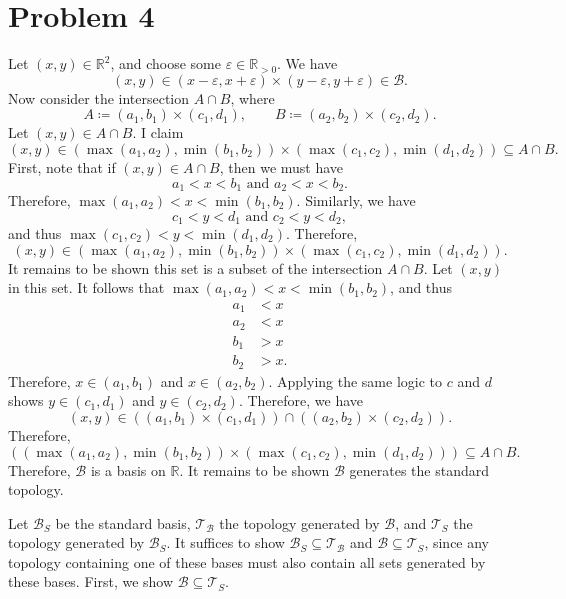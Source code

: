 \documentclass[11pt, letterpaper]{article}
\begin{document}
\section*{Problem 4}
Let $(x,y)\in\mathbb{R} ^2$, and choose some $\varepsilon \in \mathbb{R}_{>0} $. We have
\[
	(x,y)\in (x-\varepsilon ,x+\varepsilon )\times (y-\varepsilon ,y+\varepsilon )\in \mathcal{B} 
.\]
Now consider the intersection $A \cap B$, where
\[
	A\coloneqq (a_1,b_1)\times (c_1,d_1),\qquad B\coloneqq (a_2,b_2)\times (c_2,d_2)
.\]
Let $(x,y)\in A \cap B$. I claim
\[
	(x,y)\in (\max (a_1,a_2),\min (b_1,b_2))\times (\max (c_1,c_2),\min (d_1,d_2))\subseteq A \cap B
.\]
First, note that if $(x,y)\in A \cap B$, then we must have
\[
	a_1<x<b_1\text{ and } a_2<x<b_2
.\]
Therefore, $\max (a_1,a_2)<x<\min (b_1,b_2)$. Similarly, we have
\[
	c_1<y<d_1\text{ and } c_2<y<d_2
,\]
and thus $\max (c_1,c_2)<y<\min (d_1,d_2)$. Therefore,
\[
	(x,y)\in (\max (a_1,a_2),\min (b_1,b_2))\times (\max (c_1,c_2),\min (d_1,d_2))
.\]
It remains to be shown this set is a subset of the intersection $A \cap B$. Let $(x,y)$ in this set. It follows that $\max (a_1,a_2)<x<\min (b_1,b_2)$, and thus
\begin{align*}
	a_1&<x\\
	a_2&<x\\
	b_1&>x\\
	b_2&>x
.\end{align*}
Therefore, $x\in (a_1,b_1)$ and $x\in (a_2,b_2)$. Applying the same logic to $c$ and $d$ shows $y\in (c_1,d_1)$ and $y\in (c_2,d_2)$. Therefore, we have
\[
	(x,y)\in \left( \left( a_1,b_1 \right) \times \left( c_1,d_1 \right)  \right) \cap \left( \left( a_2,b_2 \right) \times \left( c_2,d_2 \right)  \right) 
.\]
Therefore,
\[
	\left( \left( \max (a_1,a_2),\min (b_1,b_2) \right) \times \left( \max (c_1,c_2), \min (d_1,d_2) \right)  \right) \subseteq A \cap  B
.\]
Therefore, $\mathcal{B} $ is a basis on $\mathbb{R} $. It remains to be shown $\mathcal{B} $ generates the standard topology.

Let $\mathcal{B}_S$ be the standard basis, $\mathcal{T}_{\mathcal{B} } $ the topology generated by $\mathcal{B} $, and $\mathcal{T}_S$ the topology generated by $\mathcal{B}_S$. It suffices to show $\mathcal{B}_S\subseteq \mathcal{T}_{\mathcal{B} } $ and $\mathcal{B} \subseteq \mathcal{T}_S$, since any topology containing one of these bases must also contain all sets generated by these bases. First, we show $\mathcal{B}\subseteq \mathcal{T}_S$.
\end{document}

